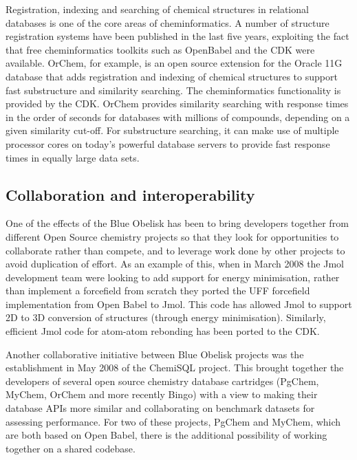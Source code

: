 \documentclass[10pt]{bmc_article}
\newenvironment{bmcformat}{\fussy\setboolean{publ}{true}}{\fussy}
\begin{document}
\begin{bmcformat}
Registration, indexing and searching of chemical structures in
relational databases is one of the core areas of cheminformatics.
A number of structure registration systems have been published in the last five years, exploiting the fact that
free cheminformatics toolkits such as OpenBabel and the CDK were available.
OrChem,\cite{WebOrChem} for example, is an open source extension for the Oracle 11G database that
adds registration and indexing of chemical structures to support fast
substructure and similarity searching. The cheminformatics
functionality is provided by the CDK. OrChem
provides similarity searching with response times in the order of
seconds for databases with millions of compounds, depending on a given
similarity cut-off. For substructure searching, it can make use of
multiple processor cores on today's powerful database servers to
provide fast response times in equally large data sets.

  \subsection*{Collaboration and interoperability}

One of the effects of the Blue Obelisk has been to bring developers
together from different Open Source chemistry projects so that they
look for opportunities to collaborate rather than compete, and to
leverage work done by other projects to avoid duplication of effort.
As an example of this, when in March 2008 the Jmol development team
were looking to add support for energy minimisation, rather than
implement a forcefield from scratch they ported the UFF forcefield\cite{Rappe:1992um}
implementation from Open Babel to Jmol. This code has allowed Jmol to
support 2D to 3D conversion of structures (through energy
minimisation). Similarly, efficient Jmol code for atom-atom rebonding
has been ported to the CDK.

Another collaborative initiative between Blue Obelisk projects was the establishment in May 2008 of
the ChemiSQL project. This brought together the developers of several
open source chemistry database cartridges (PgChem,\cite{WebPgChem} MyChem,\cite{WebMyChem} OrChem\cite{WebOrChem} and
more recently Bingo\cite{WebBingo}) with a view to making their database APIs more
similar and collaborating on benchmark datasets for assessing
performance. For two of these projects, PgChem and MyChem, which are both based on
Open Babel, there is the additional possibility of working together on a shared
codebase.


\end{bmcformat}
\end{document}
